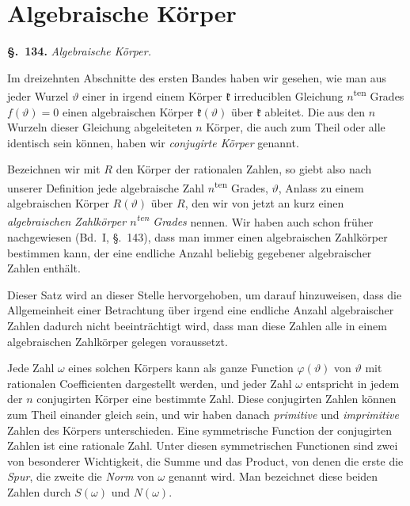 \documentclass[12pt,a4paper]{article}
\theoremstyle{definition}
\begin{document}
\newpage
\section{Algebraische Körper}\label{sec:134}

\noindent\textbf{\S.~134.}\quad
\textit{Algebraische Körper.}\par\medskip

Im dreizehnten Abschnitte des ersten Bandes haben wir gesehen, wie man aus jeder Wurzel $\vartheta$ einer in irgend einem Körper $\mathfrak{k}$ irreduciblen Gleichung $n$\textsuperscript{ten} Grades $f(\vartheta)=0$ einen algebraischen Körper $\mathfrak{k}(\vartheta)$ über $\mathfrak{k}$ ableitet. Die aus den $n$ Wurzeln dieser Gleichung abgeleiteten $n$ Körper, die auch zum Theil oder alle identisch sein können, haben wir \emph{conjugirte Körper} genannt.

Bezeichnen wir mit $R$ den Körper der rationalen Zahlen, so giebt also nach unserer Definition jede algebraische Zahl $n$\textsuperscript{ten} Grades, $\vartheta$, Anlass zu einem algebraischen Körper $R(\vartheta)$ über $R$, den wir von jetzt an kurz einen \emph{algebraischen Zahlkörper $n$\textsuperscript{ten} Grades} nennen. Wir haben auch schon früher nachgewiesen (Bd.~I, \S.~143), dass man immer einen algebraischen Zahlkörper bestimmen kann, der eine endliche Anzahl beliebig gegebener algebraischer Zahlen enthält.

Dieser Satz wird an dieser Stelle hervorgehoben, um darauf hinzuweisen, dass die Allgemeinheit einer Betrachtung über irgend eine endliche Anzahl algebraischer Zahlen dadurch nicht beeinträchtigt wird, dass man diese Zahlen alle in einem algebraischen Zahlkörper gelegen voraussetzt.

Jede Zahl $\omega$ eines solchen Körpers kann als ganze Function $\varphi(\vartheta)$ von $\vartheta$ mit rationalen Coefficienten dargestellt werden, und jeder Zahl $\omega$ entspricht in jedem der $n$ conjugirten Körper eine bestimmte Zahl. Diese conjugirten Zahlen können zum Theil einander gleich sein, und wir haben danach \emph{primitive} und \emph{imprimitive} Zahlen des Körpers unterschieden. Eine symmetrische Function der conjugirten Zahlen ist eine rationale Zahl. Unter diesen symmetrischen Functionen sind zwei von besonderer Wichtigkeit, die Summe und das Product, von denen die erste die \emph{Spur}, die zweite die \emph{Norm} von $\omega$ genannt wird. Man bezeichnet diese beiden Zahlen durch $S(\omega)$ und $N(\omega)$.
\end{document}
